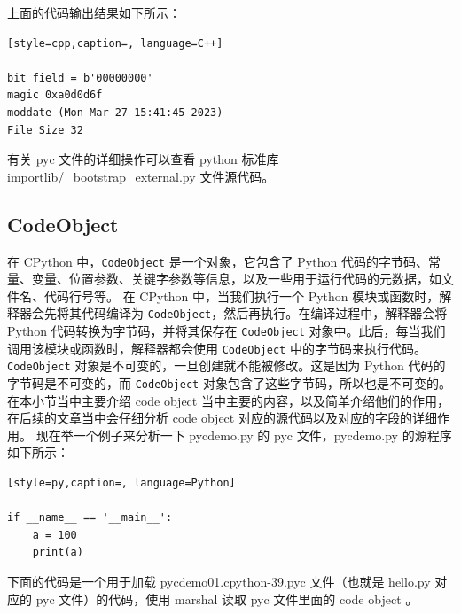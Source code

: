 上面的代码输出结果如下所示：
\begin{lstlisting}[style=cpp,caption=, language=C++]

bit field = b'00000000'
magic 0xa0d0d6f
moddate (Mon Mar 27 15:41:45 2023)
File Size 32
\end{lstlisting}
有关 pyc 文件的详细操作可以查看 python 标准库 importlib/\_bootstrap\_external.py 文件源代码。
\subsection{CodeObject}
在 CPython 中，\verb|CodeObject| 是一个对象，它包含了 Python 代码的字节码、常量、变量、位置参数、关键字参数等信息，以及一些用于运行代码的元数据，如文件名、代码行号等。
在 CPython 中，当我们执行一个 Python 模块或函数时，解释器会先将其代码编译为 \verb|CodeObject|，然后再执行。在编译过程中，解释器会将 Python 代码转换为字节码，并将其保存在 \verb|CodeObject| 对象中。此后，每当我们调用该模块或函数时，解释器都会使用 \verb|CodeObject| 中的字节码来执行代码。
\verb|CodeObject| 对象是不可变的，一旦创建就不能被修改。这是因为 Python 代码的字节码是不可变的，而 \verb|CodeObject| 对象包含了这些字节码，所以也是不可变的。
在本小节当中主要介绍 code object 当中主要的内容，以及简单介绍他们的作用，在后续的文章当中会仔细分析 code object 对应的源代码以及对应的字段的详细作用。
现在举一个例子来分析一下 pycdemo.py 的 pyc 文件，pycdemo.py 的源程序如下所示：
\begin{lstlisting}[style=py,caption=, language=Python]

if __name__ == '__main__':
    a = 100
    print(a)
\end{lstlisting}
下面的代码是一个用于加载 pycdemo01.cpython-39.pyc 文件（也就是 hello.py 对应的 pyc 文件）的代码，使用 marshal 读取 pyc 文件里面的 code object 。
